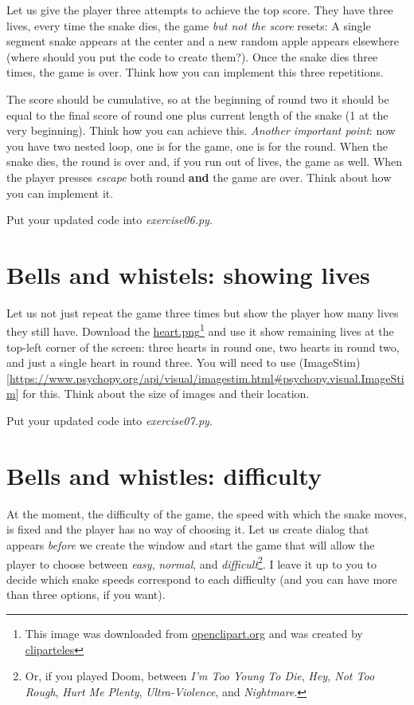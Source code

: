 \documentclass[
]{book}
\begin{document}
Let us give the player three attempts to achieve the top score. They have three lives, every time the snake dies, the game \emph{but not the score} resets: A single segment snake appears at the center and a new random apple appears elsewhere (where should you put the code to create them?). Once the snake dies three times, the game is over. Think how you can implement this three repetitions.

The score should be cumulative, so at the beginning of round two it should be equal to the final score of round one plus current length of the snake (1 at the very beginning). Think how you can achieve this. \emph{Another important point}: now you have two nested loop, one is for the game, one is for the round. When the snake dies, the round is over and, if you run out of lives, the game as well. When the player presses \emph{escape} both round \textbf{and} the game are over. Think about how you can implement it.

Put your updated code into \emph{exercise06.py}.

\hypertarget{bells-and-whistels-showing-lives}{%
\section{Bells and whistels: showing lives}\label{bells-and-whistels-showing-lives}}

Let us not just repeat the game three times but show the player how many lives they still have. Download the \href{material/heart.png}{heart.png}\footnote{This image was downloaded from \href{https://openclipart.org/}{openclipart.org} and was created by \href{https://openclipart.org/artist/cliparteles}{cliparteles}} and use it show remaining lives at the top-left corner of the screen: three hearts in round one, two hearts in round two, and just a single heart in round three. You will need to use (ImageStim){[}\url{https://www.psychopy.org/api/visual/imagestim.html\#psychopy.visual.ImageStim}{]} for this. Think about the size of images and their location.

Put your updated code into \emph{exercise07.py}.

\hypertarget{bells-and-whistles-difficulty}{%
\section{Bells and whistles: difficulty}\label{bells-and-whistles-difficulty}}

At the moment, the difficulty of the game, the speed with which the snake moves, is fixed and the player has no way of choosing it. Let us create dialog that appears \emph{before} we create the window and start the game that will allow the player to choose between \emph{easy}, \emph{normal}, and \emph{difficult}\footnote{Or, if you played Doom, between \emph{I'm Too Young To Die}, \emph{Hey, Not Too Rough}, \emph{Hurt Me Plenty}, \emph{Ultra-Violence}, and \emph{Nightmare}.}. I leave it up to you to decide which snake speeds correspond to each difficulty (and you can have more than three options, if you want).
\end{document}
